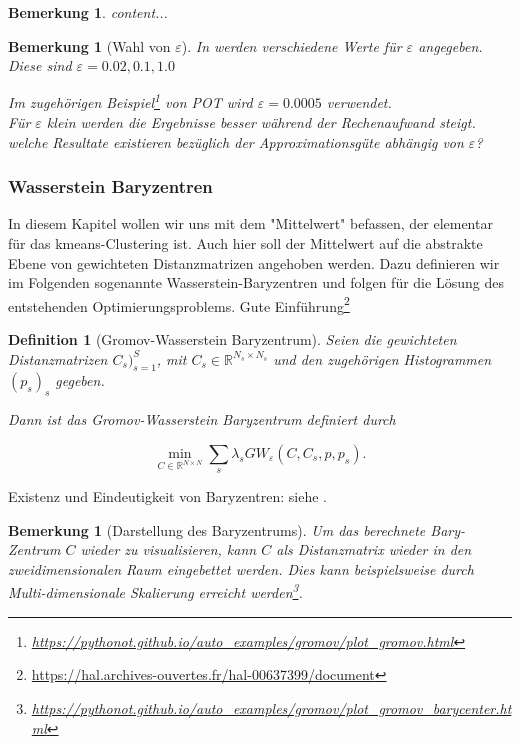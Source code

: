 \documentclass[twoside, 11pt,a4paper]{article}
\newtheorem{definition}[theorem]{Definition}
\newtheorem{remark}[theorem]{Bemerkung}
\numberwithin{equation}{section}
\begin{document}
	
	
	\begin{remark}
		content...
	\end{remark}
	
	\begin{remark}[Wahl von $\varepsilon$]
		In \cite{cuturi2013sinkhorn} werden verschiedene Werte für $\varepsilon$ angegeben. Diese sind $\varepsilon = 0.02, 0.1, 1.0$
		
		Im zugehörigen Beispiel\footnote{\url{https://pythonot.github.io/auto_examples/gromov/plot_gromov.html}} von POT wird $\varepsilon = 0.0005$ verwendet. \\
		Für $\varepsilon$ klein werden die Ergebnisse besser während der Rechenaufwand steigt.\\
		welche Resultate existieren bezüglich der Approximationsgüte abhängig von $\varepsilon$?
	\end{remark}
	\subsubsection{Wasserstein Baryzentren}
	In diesem Kapitel wollen wir uns mit dem "Mittelwert" befassen, der elementar für das kmeans-Clustering ist.
	Auch hier soll der Mittelwert auf die abstrakte Ebene von gewichteten Distanzmatrizen angehoben werden.
	Dazu definieren wir im Folgenden sogenannte Wasserstein-Baryzentren und folgen \cite{gwd_averaging_kernels} für die Lösung des entstehenden Optimierungsproblems.
	Gute Einführung\footnote{\url{https://hal.archives-ouvertes.fr/hal-00637399/document}}
	\begin{definition}[Gromov-Wasserstein Baryzentrum]
		Seien die gewichteten Distanzmatrizen $C_s)_{s=1}^S$, mit $C_s \in \mathbb{R}^{N_s \times N_s}$ und den zugehörigen Histogrammen $(p_s)_s$ gegeben.
		
		Dann ist das Gromov-Wasserstein Baryzentrum definiert durch
		
		\begin{equation}
		\min_{C \in \mathbb{R}^{N \times N}} \sum_s{\lambda_s GW_{\varepsilon}(C,C_s,p,p_s)}. \label{eq:bary_prob}
		\end{equation}
	\end{definition}
	
	Existenz und Eindeutigkeit von Baryzentren: siehe \cite{bary_wasserstein_space}.
	
	\begin{remark}[Darstellung des Baryzentrums]
		Um das berechnete Bary-Zentrum $C$ wieder zu visualisieren, kann $C$ als Distanzmatrix wieder in den zweidimensionalen Raum eingebettet werden. Dies kann beispielsweise durch Multi-dimensionale Skalierung erreicht werden\footnote{\url{https://pythonot.github.io/auto_examples/gromov/plot_gromov_barycenter.html}}.  
		
	\end{remark}
	
\end{document}
